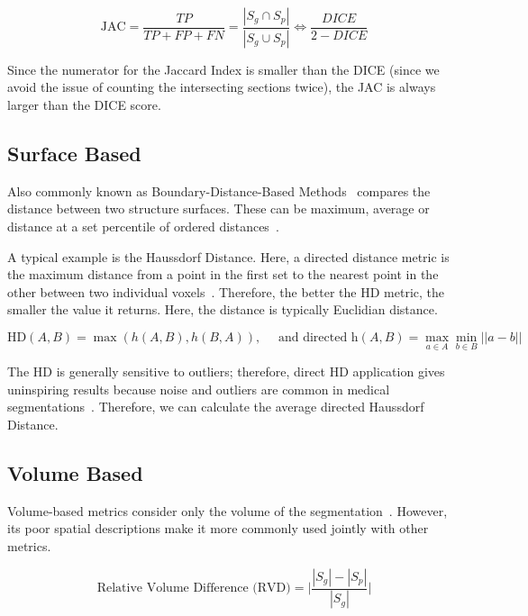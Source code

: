 \documentclass[12pt,twoside]{report}
\begin{document}
\begin{equation*}
 \text{JAC} = \frac{TP}{TP+FP+FN} = \frac{|S_g\cap S_p|}{|S_g \cup S_p|} \iff \frac{DICE}{2 - DICE}
\end{equation*}

Since the numerator for the Jaccard Index is smaller than the DICE (since we avoid the issue of counting the intersecting sections twice), the JAC is always larger than the DICE score.

\subsection{Surface Based}\label{sect:surface-based}

Also commonly known as Boundary-Distance-Based Methods~\cite{boundary-overlap-metrics} compares the distance between two structure
surfaces. These can be maximum, average or distance at a set percentile of ordered distances~\cite{evaluation-metrics}.

A typical example is the Haussdorf Distance. Here, a directed distance metric is the maximum distance from a point in the first set to the nearest point in the other between two individual voxels~\cite{boundary-overlap-metrics}. Therefore, the better the HD metric, the smaller the value it returns. Here, the distance is typically Euclidian distance.

\begin{equation*}
 \text{HD}(A,B) = \max(h(A,B), h(B,A)), \quad \text{ and directed h}(A,B)=\max_{a\in A}\min_{b \in B} ||a-b||
\end{equation*}

The HD is generally sensitive to outliers; therefore, direct HD application gives uninspiring results because noise and outliers are common in medical segmentations~\cite{boundary-overlap-metrics}. Therefore, we can calculate the average directed Haussdorf Distance.

\subsection{Volume Based}

Volume-based metrics consider only the volume of the segmentation~\cite{evaluation-of-metrics-in-prostate,review-metrics, boundary-overlap-metrics}. However, its poor spatial descriptions make it more commonly used jointly with other metrics.

\begin{equation*}
 \text{Relative Volume Difference (RVD)} = \bigg| \frac{|S_g|-|S_p|}{|S_g|}\bigg|
\end{equation*}
\end{document}

